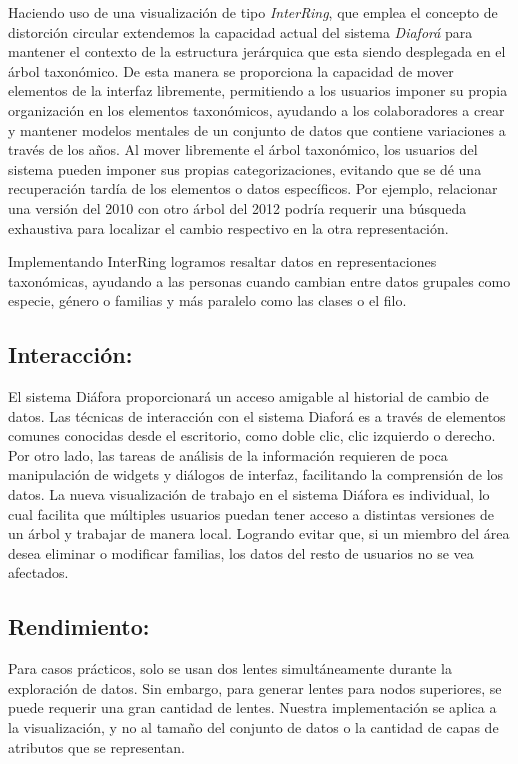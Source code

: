 \documentclass[journal]{IEEEtran}
\begin{document}
Haciendo uso de una visualización de tipo \emph{InterRing}\cite{yang_ward_rundensteiner}, que emplea
el concepto de distorción circular extendemos la capacidad actual del sistema \emph{Diaforá} para mantener el contexto
de la estructura jerárquica que esta siendo desplegada en el árbol taxonómico. De esta manera se proporciona la capacidad de mover elementos de la interfaz libremente, permitiendo a los usuarios imponer su propia organización en los elementos taxonómicos, ayudando a los colaboradores a crear y mantener modelos mentales de un conjunto de datos que contiene variaciones a través de los años. 
Al mover libremente el árbol taxonómico, los usuarios del sistema pueden imponer sus propias categorizaciones, evitando que se dé una recuperación tardía de los elementos o datos específicos. Por ejemplo, relacionar una versión del 2010 con otro árbol del 2012 podría requerir una búsqueda exhaustiva para localizar el cambio respectivo en la otra representación. 

Implementando InterRing logramos resaltar datos en representaciones taxonómicas, ayudando a las personas cuando cambian entre datos grupales como especie, género o familias y más paralelo como las clases o el filo. 

\subsection{Interacción: }
El sistema Diáfora proporcionará un acceso amigable al historial de cambio de datos. Las técnicas de interacción con el sistema Diaforá es a través de elementos comunes
conocidas desde el escritorio, como doble clic, clic izquierdo o derecho. Por otro lado, las tareas de análisis de la información requieren de poca manipulación de widgets y diálogos de interfaz, facilitando la comprensión de los datos. 
La nueva visualización de trabajo en el sistema Diáfora es individual, lo cual facilita que múltiples usuarios puedan tener acceso a distintas versiones de un árbol y trabajar de manera local. Logrando evitar que, si un miembro del área desea eliminar o modificar familias, los datos del resto de usuarios no se vea afectados.

\subsection{Rendimiento: }
Para casos prácticos, solo se usan dos lentes simultáneamente durante la exploración de datos. Sin embargo, para generar lentes para nodos superiores, se puede requerir una gran cantidad de lentes. Nuestra implementación se aplica a la visualización, y no al tamaño del conjunto de datos o la cantidad de capas de atributos que se representan.
\end{document}
